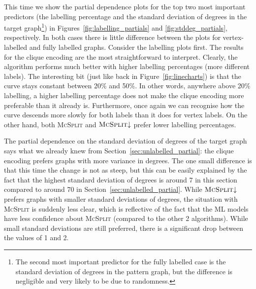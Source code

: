 \documentclass{l4proj}
\theoremstyle{definition}
\theoremstyle{remark}
\begin{document}
This time we show the partial dependence plots for the top two most
important predictors (the labelling percentage and the standard deviation of
degrees in the target graph\footnote{The second most important predictor for the
fully labelled case is the standard deviation of degrees in the pattern graph,
but the difference is negligible and very likely to be due to randomness.}) in
Figures~\ref{fig:labelling_partials} and \ref{fig:stddeg_partials},
respectively. In both cases there is little difference between the plots for
vertex-labelled and fully labelled graphs. Consider the labelling plots first.
The results for the clique encoding are the most straightforward to interpret.
Clearly, the algorithm performs much better with higher labelling percentages
(more different labels). The interesting bit (just like back in
Figure~\ref{fig:linecharts}) is that the curve stays constant between 20\% and
50\%. In other words, anywhere above 20\% labelling, a higher labelling
percentage does not make the clique encoding more preferable than it already is.
Furthermore, once again we can recognise how the curve descends more slowly for
both labels than it does for vertex labels. On the other hand, both
\textsc{McSplit} and $\textsc{McSplit}{\downarrow}$ prefer lower labelling
percentages.

The partial dependence on the standard deviation of degrees of the target graph
says what we already knew from Section~\ref{sec:unlabelled_partial}: the clique
encoding prefers graphs with more variance in degrees. The one small difference
is that this time the change is not as steep, but this can be easily explained
by the fact that the highest standard deviation of degrees is around 7 in this
section compared to around 70 in Section~\ref{sec:unlabelled_partial}. While
$\textsc{McSplit}{\downarrow}$ prefers graphs with smaller standard deviations of
degrees, the situation with \textsc{McSplit} is suddenly less clear, which is
reflective of the fact that the ML models have less confidence about
\textsc{McSplit} (compared to the other 2 algorithms). While small standard
deviations are still preferred, there is a significant drop between the values
of 1 and 2.
\end{document}
